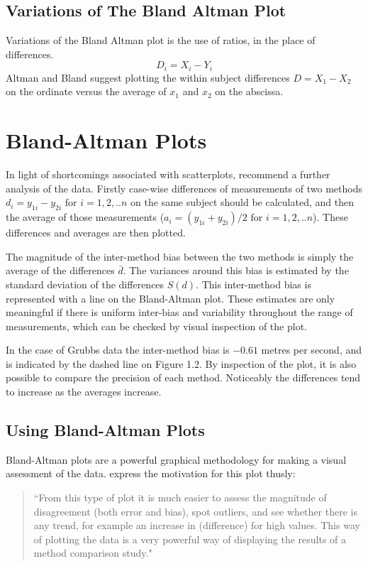 \documentclass[Main.tex]{subfiles}
\begin{document}
	\subsection{Variations of The Bland Altman Plot}

	Variations of the Bland Altman plot is the use of ratios, in the
	place of differences.
	\begin{equation}
	D_{i} = X_{i} - Y_{i}   \label{BA01}
	\end{equation}
	Altman and Bland suggest plotting the within subject differences $
	D = X_{1} - X_{2} $ on the ordinate versus the average of $x_{1}$
	and  $x_{2}$ on the abscissa.
	

	
	
	\section{Bland-Altman Plots}

	

	
	In light of shortcomings associated with scatterplots,
	\citet*{BA83} recommend a further analysis of the data. Firstly
	case-wise differences of measurements of two methods $d_{i} =
	y_{1i}-y_{2i} \mbox{ for }i=1,2,..n$ on the same subject should be
	calculated, and then the average of those measurements ($a_{i} =
	(y_{1i} + y_{2i})/2 \mbox{ for }i=1,2,..n$). These differences and
	averages are then plotted. 
	
	

	
	The magnitude of the inter-method bias between the two methods is
	simply the average of the differences $\bar{d}$. The variances
	around this bias is estimated by the standard deviation of the
	differences $S(d)$. This inter-method bias is represented with a
	line on the Bland-Altman plot. These estimates are only meaningful
	if there is uniform inter-bias and variability throughout the
	range of measurements, which can be checked by visual inspection
	of the plot. 
	
	In the case of Grubbs data the inter-method bias is
	$-0.61$ metres per second, and is indicated by the dashed line on
	Figure 1.2. By inspection of the plot, it is also possible to
	compare the precision of each method. Noticeably the differences
	tend to increase as the averages increase.
	
	


	
	
	\subsection{Using Bland-Altman Plots}
	Bland-Altman plots are a powerful graphical methodology for making
	a visual assessment of the data. \citet*{BA83} express the
	motivation for this plot thusly:
	\begin{quote}
		``From this type of plot it is much easier to assess the magnitude
		of disagreement (both error and bias), spot outliers, and see
		whether there is any trend, for example an increase in
		(difference) for high values. This way of plotting the data is a
		very powerful way of displaying the results of a method comparison
		study."
	\end{quote}
	
\end{document}
